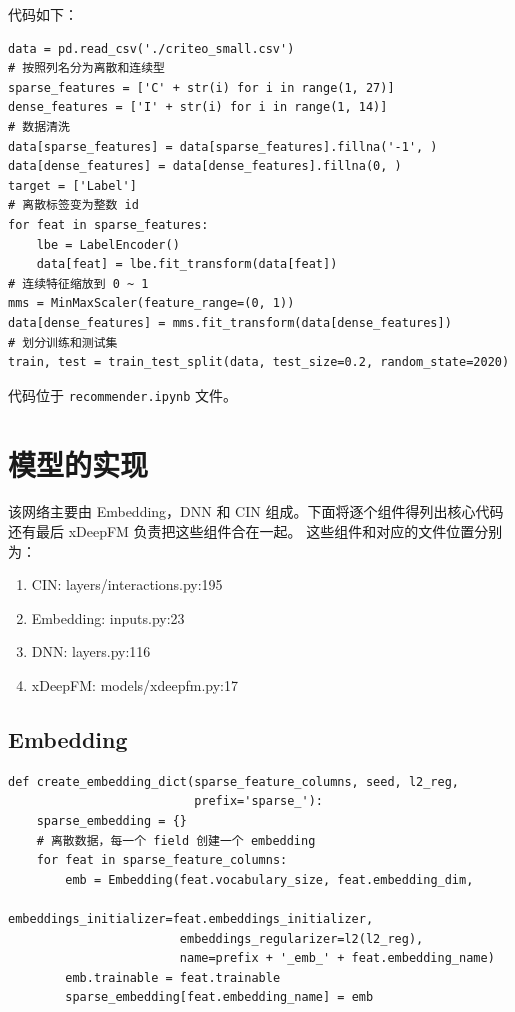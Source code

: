 \documentclass[degree=project,degree-type=project,cjk-font=noto]{thuthesis}
\begin{document}
代码如下：

  \begin{verbatim}
data = pd.read_csv('./criteo_small.csv')
# 按照列名分为离散和连续型
sparse_features = ['C' + str(i) for i in range(1, 27)]
dense_features = ['I' + str(i) for i in range(1, 14)]
# 数据清洗
data[sparse_features] = data[sparse_features].fillna('-1', )
data[dense_features] = data[dense_features].fillna(0, )
target = ['Label']
# 离散标签变为整数 id
for feat in sparse_features:
    lbe = LabelEncoder()
    data[feat] = lbe.fit_transform(data[feat])
# 连续特征缩放到 0 ~ 1
mms = MinMaxScaler(feature_range=(0, 1))
data[dense_features] = mms.fit_transform(data[dense_features])
# 划分训练和测试集
train, test = train_test_split(data, test_size=0.2, random_state=2020)
  \end{verbatim}

代码位于 \texttt{recommender.ipynb} 文件。

\section{模型的实现}

该网络主要由 Embedding，DNN 和 CIN 组成。下面将逐个组件得列出核心代码
还有最后 xDeepFM 负责把这些组件合在一起。
这些组件和对应的文件位置分别为：

\begin{enumerate}
  \item CIN: layers/interactions.py:195
  \item Embedding: inputs.py:23
  \item DNN: layers.py:116
  \item xDeepFM: models/xdeepfm.py:17
\end{enumerate}

\subsection{Embedding}

  \begin{verbatim}
def create_embedding_dict(sparse_feature_columns, seed, l2_reg,
                          prefix='sparse_'):
    sparse_embedding = {}
    # 离散数据，每一个 field 创建一个 embedding
    for feat in sparse_feature_columns:
        emb = Embedding(feat.vocabulary_size, feat.embedding_dim,
                        embeddings_initializer=feat.embeddings_initializer,
                        embeddings_regularizer=l2(l2_reg),
                        name=prefix + '_emb_' + feat.embedding_name)
        emb.trainable = feat.trainable
        sparse_embedding[feat.embedding_name] = emb
  \end{verbatim}
\end{document}
